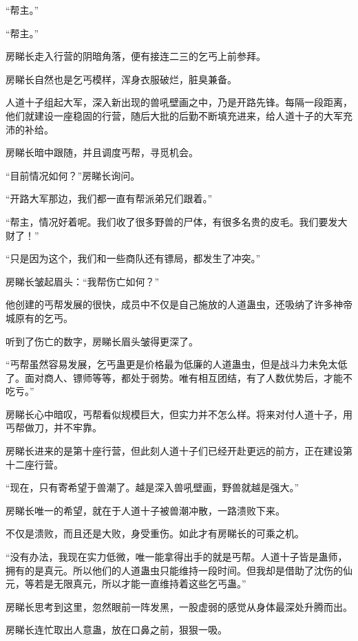 
\begin{this_body}

“帮主。”

“帮主。”

房睇长走入行营的阴暗角落，便有接连二三的乞丐上前参拜。

房睇长自然也是乞丐模样，浑身衣服破烂，脏臭兼备。

人道十子组起大军，深入新出现的兽吼壁画之中，乃是开路先锋。每隔一段距离，他们就建设一座稳固的行营，随后大批的后勤不断填充进来，给人道十子的大军充沛的补给。

房睇长暗中跟随，并且调度丐帮，寻觅机会。

“目前情况如何？”房睇长询问。

“开路大军那边，我们都一直有帮派弟兄们跟着。”

“帮主，情况好着呢。我们收了很多野兽的尸体，有很多名贵的皮毛。我们要发大财了！”

“只是因为这个，我们和一些商队还有镖局，都发生了冲突。”

房睇长皱起眉头：“我帮伤亡如何？”

他创建的丐帮发展的很快，成员中不仅是自己施放的人道蛊虫，还吸纳了许多神帝城原有的乞丐。

听到了伤亡的数字，房睇长眉头皱得更深了。

“丐帮虽然容易发展，乞丐蛊更是价格最为低廉的人道蛊虫，但是战斗力未免太低了。面对商人、镖师等等，都处于弱势。唯有相互团结，有了人数优势后，才能不吃亏。”

房睇长心中暗叹，丐帮看似规模巨大，但实力并不怎么样。将来对付人道十子，用丐帮做刀，并不牢靠。

房睇长进来的是第十座行营，但此刻人道十子们已经开赴更远的前方，正在建设第十二座行营。

“现在，只有寄希望于兽潮了。越是深入兽吼壁画，野兽就越是强大。”

房睇长唯一的希望，就在于人道十子被兽潮冲散，一路溃败下来。

不仅是溃败，而且还是大败，身受重伤。如此才有房睇长的可乘之机。

“没有办法，我现在实力低微，唯一能拿得出手的就是丐帮。人道十子皆是蛊师，拥有的是真元。所以他们的人道蛊虫只能维持一段时间。但我却是借助了沈伤的仙元，等若是无限真元，所以才能一直维持着这些乞丐蛊。”

房睇长思考到这里，忽然眼前一阵发黑，一股虚弱的感觉从身体最深处升腾而出。

房睇长连忙取出人意蛊，放在口鼻之前，狠狠一吸。


\end{this_body}
